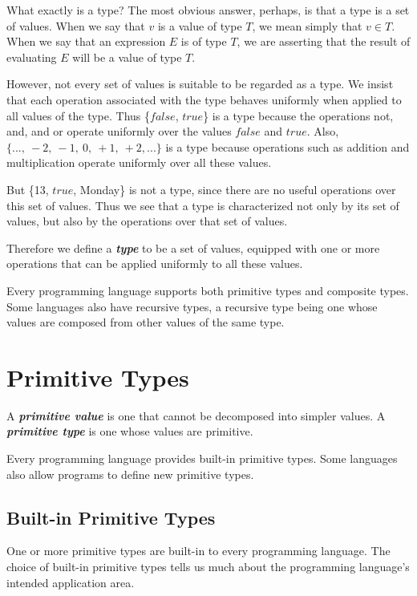 \documentclass{article}
\begin{document}
What exactly is a type? The most obvious answer, perhaps, is that a type is a set of values. When we say that $v$ is a value of type $T$, we mean simply that $v \in T$. When we say that an expression $E$ is of type $T$, we are asserting that the result of evaluating $E$ will be a value of type $T$.

However, not every set of values is suitable to be regarded as a type. We insist that each operation associated with the type behaves uniformly when applied to all values of the type. Thus \{$false$, $true$\} is a type because the operations not, and, and or operate uniformly over the values $false$ and $true$. Also, $\{...,\ -2,\ -1,\ 0,\ +1,\ +2,...\}$ is a type because operations such as addition and multiplication operate uniformly over all these values. 

But \{13, $true$, Monday\} is not a type, since there are no useful
operations over this set of values. Thus we see that a type is characterized not only by its set of values, but also by the operations over that set of values.

Therefore we define a \textbf{\textit{type}} to be a set of values, equipped with one or more operations that can be applied uniformly to all these values. 

Every programming language supports both primitive types and composite types. Some languages also have recursive types, a recursive type being one whose values are composed from other values of the same type.

\section{Primitive Types}

A \textbf{\textit{primitive value}} is one that cannot be decomposed into simpler values. A \textbf{\textit{primitive type}} is one whose values are primitive.

Every programming language provides built-in primitive types. Some languages also allow programs to define new primitive types.

\subsection{Built-in Primitive Types}

One or more primitive types are built-in to every programming language. The choice of built-in primitive types tells us much about the programming language’s intended application area. 
\end{document}
